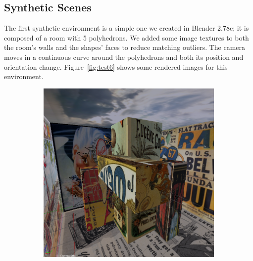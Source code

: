 \subsection{Synthetic Scenes}
The first synthetic environment is a simple one we created in Blender 2.78c;
it is composed of a room with 5 polyhedrons. We added some image textures to both
the room's walls and the shapes' faces to reduce matching outliers.
The camera moves in a continuous curve around the polyhedrons and both its
position and orientation change.
Figure~\ref{fig:test6} shows some rendered images for this environment.
%
\begin{figure}
\centering
	\begin{subfigure}{0.4\textwidth}
		\centering
		\includegraphics[width=\textwidth]{img/test6_1}
	\end{subfigure}
	\begin{subfigure}{0.4\textwidth}
		\centering

\end{subfigure}
\end{figure}
